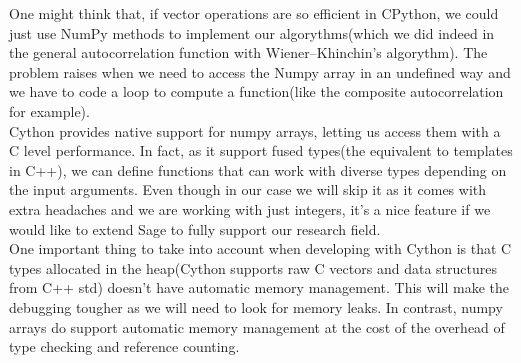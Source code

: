 One might think that, if vector operations are so efficient in CPython, we could
just use NumPy methods to implement our algorythms(which we did indeed in
the general autocorrelation function with Wiener–Khinchin's algorythm). The
problem raises when we need to access the Numpy array in an undefined way and
we have to code a loop to compute a function(like the composite autocorrelation
for example).\\

Cython provides native support for numpy arrays, letting us access them with a
C level performance. In fact, as it support fused types(the equivalent to
templates in C++), we can define functions that can work with diverse types
depending on the input arguments. Even though in our case we will skip it
as it comes with extra headaches and we are working with just integers,
it's a nice feature if we would like to extend Sage to fully support our
research field.\\

One important thing to take into account when developing with Cython is that
C types allocated in the heap(Cython supports raw C vectors and data structures
from C++ std) doesn't have automatic memory management. This will make the
debugging tougher as we will need to look for memory leaks. In contrast,
numpy arrays do support automatic memory management at the cost of the overhead
of type checking and reference counting.\\
